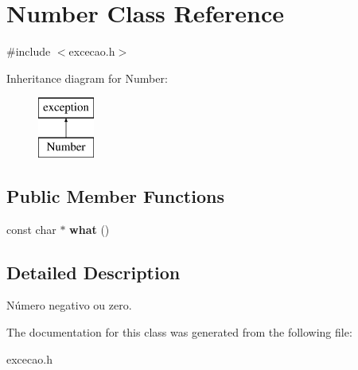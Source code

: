 \hypertarget{classNumber}{}\section{Number Class Reference}
\label{classNumber}


{\ttfamily \#include $<$excecao.\+h$>$}

Inheritance diagram for Number\+:\begin{figure}[H]
\begin{center}
\leavevmode
\includegraphics[height=2.000000cm]{classNumber}
\end{center}
\end{figure}
\subsection*{Public Member Functions}
\begin{DoxyCompactItemize}
\item 
\mbox{\label{classNumber_addefb1064a86bcd1db99b1a38bd730ac}} 
const char $\ast$ {\bfseries what} ()
\end{DoxyCompactItemize}


\subsection{Detailed Description}
Número negativo ou zero. 

The documentation for this class was generated from the following file\+:\begin{DoxyCompactItemize}
\item 
excecao.\+h\end{DoxyCompactItemize}
